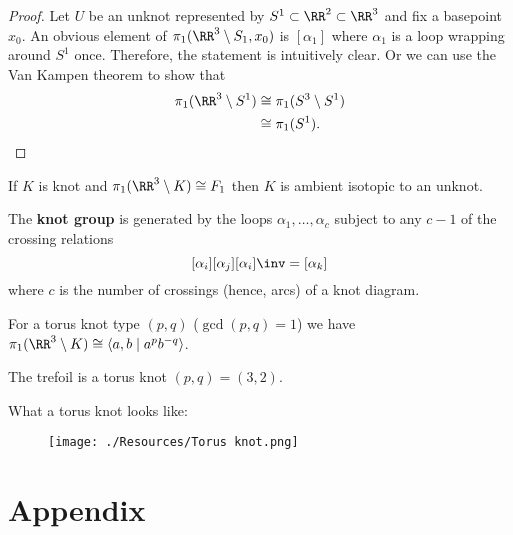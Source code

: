 \documentclass[12pt, a4paper]{article}
\begin{document}
\begin{proof}
    Let \(U\) be an unknot represented by \(S^1 \subset \RR^2\subset \RR^3\) and fix a basepoint \(x_0\). An obvious element of \(\pi_1(\RR^3\setminus S_1,x_0)\) is \([\alpha_1]\) where \(\alpha_1\) is a loop wrapping around \(S^1\) once. Therefore, the statement is intuitively clear. Or we can use the Van Kampen theorem to show that 
    \[\begin{aligned}
        \pi_1(\RR^3\setminus S^1) &\cong \pi_1(S^3\setminus S^1) \\
        &\cong \pi_1(S^1).
    \end{aligned}\]
\end{proof}

\begin{mdthm}
    If \(K\) is knot and \(\pi_1(\RR^3\setminus K) \cong F_1\) then \(K\) is ambient isotopic to an unknot.
\end{mdthm}

\begin{mdprop}
    The \textbf{knot group} is generated by the loops \(\alpha_1,\ldots,\alpha_c\) subject to any \(c-1\) of the crossing relations
    \[[\alpha_i][\alpha_j][\alpha_i]\inv =[\alpha_k]\] 
    where \(c\) is the number of crossings (hence, arcs) of a knot diagram.
\end{mdprop}

\begin{proposition}
    For a torus knot type \((p,q)\) (\(\gcd(p,q)=1\)) we have \(\pi_1(\RR^3\setminus K)\cong \langle a,b \mid a^p b^{-q} \rangle\).
\end{proposition}

\begin{mdexample}
    The trefoil is a torus knot \((p,q)=(3,2)\).
\end{mdexample}

\begin{example}
    What a torus knot looks like:
    \begin{figure}[H]
         \begin{center}
             \texttt{[image: ./Resources/Torus knot.png]}
         \end{center}
    \end{figure}
\end{example}

\pagebreak

\appendix

\section*{Appendix}
\end{document}
